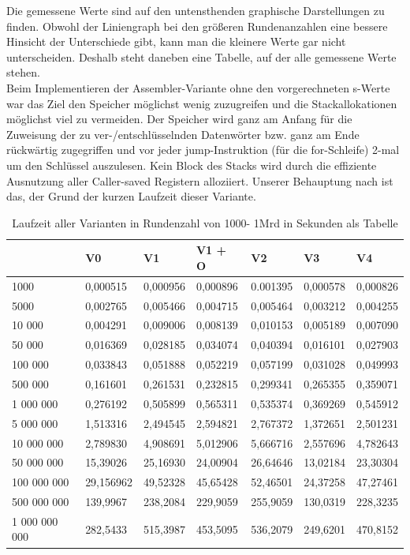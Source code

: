 \documentclass[course=asp]{aspdoc}
\begin{document}
Die gemessene Werte sind auf den untensthenden graphische Darstellungen zu finden. Obwohl der Liniengraph bei den größeren Rundenanzahlen eine bessere Hinsicht der Unterschiede gibt, kann man die kleinere Werte gar nicht unterscheiden. Deshalb steht daneben eine Tabelle, auf der alle gemessene Werte stehen.\\
Beim Implementieren der Assembler-Variante ohne den vorgerechneten s-Werte war das Ziel den Speicher möglichst wenig
zuzugreifen und die Stackallokationen möglichst viel zu vermeiden. Der Speicher wird ganz am Anfang für die
Zuweisung der zu ver-/entschlüsselnden Datenwörter bzw. ganz am Ende rückwärtig zugegriffen und vor jeder
jump-Instruktion (für die for-Schleife) 2-mal um den Schlüssel auszulesen. Kein Block des Stacks wird durch
die effiziente Ausnutzung aller Caller-saved Registern alloziiert. Unserer Behauptung nach ist das, der Grund der
kurzen Laufzeit dieser Variante.

\begin{table}[H]
\centering
    \begin{tabular}{|l|l|l|l|l|l|l|}
     \hline 	       & V0 & V1 & V1 + O & V2 & V3 & V4  \\
     \hline 1000 & 0,000515 & 0,000956 & 0,000896 & 0.001395 & 0,000578  & 0,000826  \\
	 \hline 5000 & 0,002765 & 0,005466 & 0,004715 & 0,005464 & 0,003212  & 0,004255  \\
	 \hline 10 000 & 0,004291 & 0,009006 & 0,008139 & 0,010153 & 0,005189  &  0,007090 \\
	 \hline 50 000 & 0,016369 & 0,028185 & 0,034074 & 0,040394 & 0,016101  & 0,027903 \\
     \hline 100 000 & 0,033843 & 0,051888 & 0,052219 & 0,057199 & 0,031028  & 0,049993 \\
	 \hline 500 000 & 0,161601 & 0,261531 & 0,232815 & 0,299341 & 0,265355 & 0,359071\\
	 \hline 1 000 000 & 0,276192 & 0,505899 & 0,565311 & 0,535374 & 0,369269  & 0,545912 \\
	 \hline 5 000 000 & 1,513316 & 2,494545 & 2,594821 & 2,767372 & 1,372651  & 2,501231\\
     \hline 10 000 000 & 2,789830 & 4,908691 & 5,012906 & 5,666716 & 2,557696  & 4,782643 \\
	 \hline 50 000 000 & 15,39026 & 25,16930 & 24,00904 & 26,64646 & 13,02184  & 23,30304  \\
	 \hline 100 000 000 & 29,156962 & 49,52328 & 45,65428 & 52,46501 & 24,37258 & 47,27461 \\
	 \hline 500 000 000 & 139,9967 & 238,2084 & 229,9059 & 255,9059 & 130,0319 & 228,3235 \\
     \hline 1 000 000 000 & 282,5433 & 515,3987 & 453,5095 & 536,2079 & 249,6201  & 470,8152 \\
	\hline
    \end{tabular}
    \caption{Laufzeit aller Varianten in Rundenzahl von 1000- 1Mrd in Sekunden als Tabelle}
\end{table}
\end{document}
